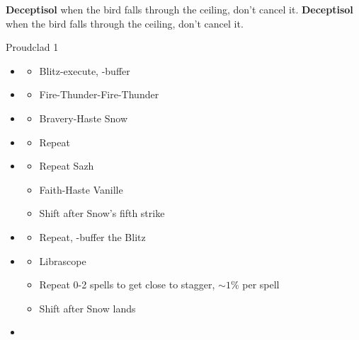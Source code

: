 \begin{paracol}{2}
\textbf{Deceptisol} when the bird falls through the ceiling, don't cancel it.
\switchcolumn
{}
\textbf{Deceptisol} when the bird falls through the ceiling, don't cancel it.
\switchcolumn*
\begin{battle}{Proudclad 1}
	\begin{itemize}
		\item \second
		      \begin{itemize}
			      \item Blitz-execute, \rav-buffer
		      \end{itemize}
		\item \sixth
		      \begin{itemize}
			      \item Fire-Thunder-Fire-Thunder
		      \end{itemize}
		\item \fourth
		      \begin{itemize}
			      \item Bravery-Haste Snow
		      \end{itemize}
		\item \sixth
		      \begin{itemize}
			      \item Repeat
		      \end{itemize}
		\item \fourth
		      \begin{itemize}
			      \item Repeat Sazh
			      \item Faith-Haste Vanille
			      \item Shift after Snow's fifth strike
		      \end{itemize}
		\item \first
		      \begin{itemize}
			      \item Repeat, \rav-buffer the Blitz
		      \end{itemize}
		\item \fifth
		      \begin{itemize}
			      \item Librascope
			      \item Repeat 0-2 spells to get close to stagger, $\sim1\%$ per spell
			      \item Shift after Snow lands
		      \end{itemize}
		\item \sixth
		      \begin{itemize}

\end{itemize}
\end{itemize}
\end{battle}
\end{paracol}
